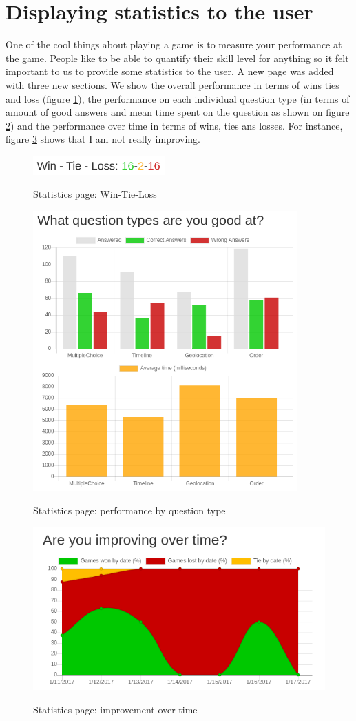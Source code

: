 \section{Displaying statistics to the user}
One of the cool things about playing a game is to measure your performance at the game. People like to be able to quantify their skill level for anything so it felt important to us to provide some statistics to the user. A new page was added with three new sections. We show the overall performance in terms of wins ties and loss (figure \ref{fig:statsWTL}), the performance on each individual question type (in terms of amount of good answers and mean time spent on the question as shown on figure \ref{fig:statsQP}) and the performance over time in terms of wins, ties ans losses. For instance, figure \ref{fig:statsTI} shows that I am not really improving.
\begin{figure}
\centering
{\includegraphics[width=2in]{images/wtl.png}}
\caption{Statistics page: Win-Tie-Loss}
\label{fig:statsWTL}
\end{figure}
\begin{figure}
\centering
{\includegraphics[width=4in]{images/questions_perf.png}}
\caption{Statistics page: performance by question type}
\label{fig:statsQP}
\end{figure}
\begin{figure}
\centering
{\includegraphics[width=4.5in]{images/time_improv.png}}
\caption{Statistics page: improvement over time}
\label{fig:statsTI}
\end{figure}